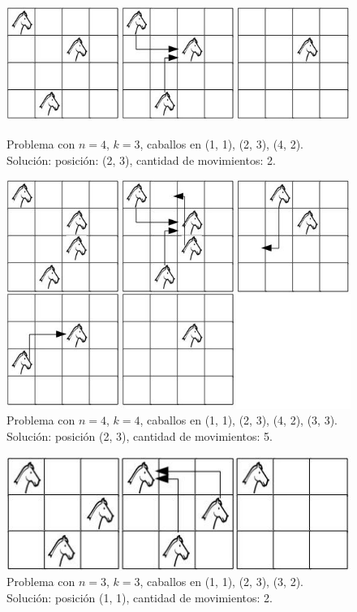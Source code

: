 \documentclass[a4paper]{article}
\begin{document}
\begin{figure}[h!]
\centering
\includegraphics[scale=0.7]{instancia1.jpg}\caption{Problema con $n = 4$, $k = 3$, caballos en (1, 1), (2, 3), (4, 2). Soluci\'on: posición: (2, 3), cantidad de movimientos: 2.}
\vspace{0.2cm}
\centering
\includegraphics[scale=0.7]{instancia2.jpg}\caption{Problema con $n = 4$, $k = 4$, caballos en (1, 1), (2, 3), (4, 2), (3, 3). Solución: posición (2, 3), cantidad de movimientos: 5.}
\end{figure}

\begin{figure}
\centering
\includegraphics[scale=0.7]{instancia3.jpg}\caption{Problema con $n = 3$, $k = 3$, caballos en (1, 1), (2, 3), (3, 2). Solución: posición (1, 1), cantidad de movimientos: 2.}
\end{figure}
\end{document}

